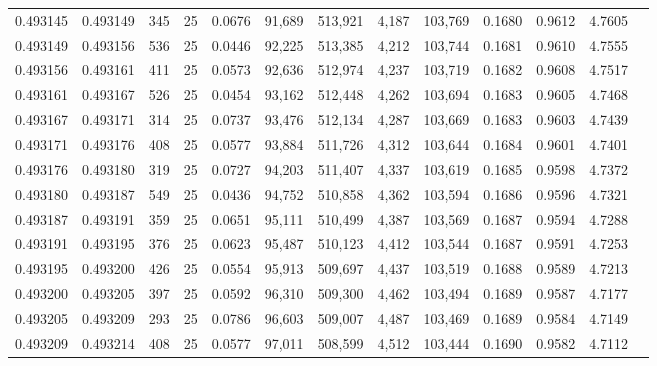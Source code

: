 \begin{tabular}{rrrrrrrrrrrrr}
0.493145 & 0.493149 &   345 &  25 &                                     0.0676 &  91,689 & 513,921 &   4,187 & 103,769 & 0.1680 & 0.9612 & 4.7605 \\
0.493149 & 0.493156 &   536 &  25 &                                     0.0446 &  92,225 & 513,385 &   4,212 & 103,744 & 0.1681 & 0.9610 & 4.7555 \\
0.493156 & 0.493161 &   411 &  25 &                                     0.0573 &  92,636 & 512,974 &   4,237 & 103,719 & 0.1682 & 0.9608 & 4.7517 \\
0.493161 & 0.493167 &   526 &  25 &                                     0.0454 &  93,162 & 512,448 &   4,262 & 103,694 & 0.1683 & 0.9605 & 4.7468 \\
0.493167 & 0.493171 &   314 &  25 &                                     0.0737 &  93,476 & 512,134 &   4,287 & 103,669 & 0.1683 & 0.9603 & 4.7439 \\
0.493171 & 0.493176 &   408 &  25 &                                     0.0577 &  93,884 & 511,726 &   4,312 & 103,644 & 0.1684 & 0.9601 & 4.7401 \\
0.493176 & 0.493180 &   319 &  25 &                                     0.0727 &  94,203 & 511,407 &   4,337 & 103,619 & 0.1685 & 0.9598 & 4.7372 \\
0.493180 & 0.493187 &   549 &  25 &                                     0.0436 &  94,752 & 510,858 &   4,362 & 103,594 & 0.1686 & 0.9596 & 4.7321 \\
0.493187 & 0.493191 &   359 &  25 &                                     0.0651 &  95,111 & 510,499 &   4,387 & 103,569 & 0.1687 & 0.9594 & 4.7288 \\
0.493191 & 0.493195 &   376 &  25 &                                     0.0623 &  95,487 & 510,123 &   4,412 & 103,544 & 0.1687 & 0.9591 & 4.7253 \\
0.493195 & 0.493200 &   426 &  25 &                                     0.0554 &  95,913 & 509,697 &   4,437 & 103,519 & 0.1688 & 0.9589 & 4.7213 \\
0.493200 & 0.493205 &   397 &  25 &                                     0.0592 &  96,310 & 509,300 &   4,462 & 103,494 & 0.1689 & 0.9587 & 4.7177 \\
0.493205 & 0.493209 &   293 &  25 &                                     0.0786 &  96,603 & 509,007 &   4,487 & 103,469 & 0.1689 & 0.9584 & 4.7149 \\
0.493209 & 0.493214 &   408 &  25 &                                     0.0577 &  97,011 & 508,599 &   4,512 & 103,444 & 0.1690 & 0.9582 & 4.7112 \\

\end{tabular}
